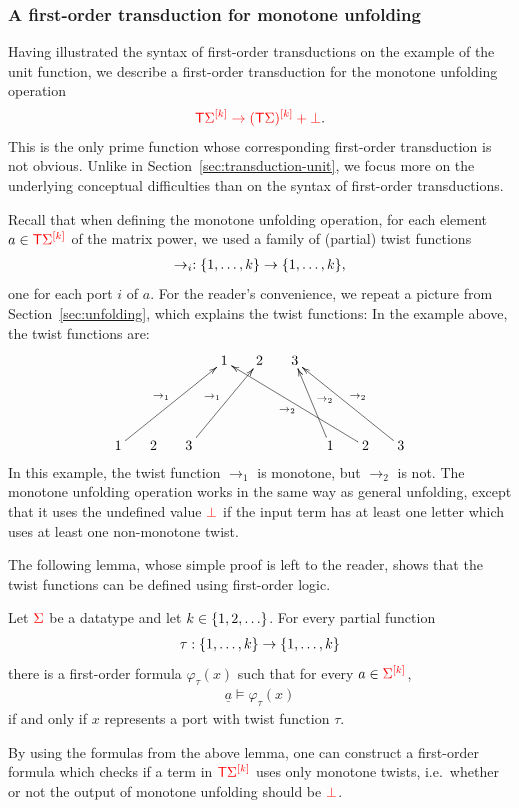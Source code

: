\subsubsection{A first-order transduction for monotone unfolding}
\label{sec:fo-transduction-for-unfolding}
Having illustrated the syntax of first-order transductions on the example of the unit function, we describe a first-order transduction for the monotone unfolding operation 
\begin{align*}
    \ranked{\tmonad \mati k{\Sigma} \to \mati k{( \tmonad \Sigma)} + \termset}.
\end{align*}
This is the only prime function whose corresponding first-order transduction is not obvious.
Unlike in Section~\ref{sec:transduction-unit},  we focus more  on the underlying conceptual difficulties than on the syntax of first-order transductions. 

Recall  that when  defining the  monotone  unfolding operation,  for each element $a \in \ranked{\tmonad \mati k{\Sigma}}$ of the matrix power, we used a family of (partial) twist functions
\begin{align*}
\to_i : \set{1,\ldots,k} \to \set{1,\ldots,k},
\end{align*}
one for each port $i$ of $a$. For the reader's convenience, we repeat a picture from Section~\ref{sec:unfolding}, which explains the twist functions:
In the example  above, the twist functions are:
\begin{align*}
\xymatrix@C=0.5cm@R=1.7cm{
     & && 1 & 2 & 3 \\
    1\ar[urrr]^-{\to_1} & 2 & 3 \ar[urr]^-{\to_1} &&&&
    1\ar[ul]_-{\to_2} & 2\ar[ullll]^-{\to_2} & 3\ar[ulll]_-{\to_2}
}
\end{align*}
In this example, the twist function $\to_1$ is monotone, but  $\to_2$ is not. The monotone unfolding operation works in the same way as general  unfolding, except that it uses the undefined value $\termset$ if the input term has at least one letter which uses at least one non-monotone twist. 

The following lemma, whose simple proof is left to the reader, shows that the twist functions can be defined using first-order logic.
\begin{lemma}
    Let $\rSigma$ be a datatype and let $k \in \set{1,2,\ldots}$. For every partial function
    \begin{align*}
    \tau : \set{1,\ldots,k} \to \set{1,\ldots,k}
    \end{align*}
    there is a first-order formula $\varphi_\tau(x)$ such that for every $a \in \mati k \rSigma$, 
    \begin{align*}
    \underline a \models \varphi_\tau(x)
    \end{align*}
     if and only if $x$ represents a port  with twist function $\tau$.  
\end{lemma}
By using the formulas from the above lemma, one can construct  a first-order formula which checks if a term in $\tmonad \mati k \rSigma$ uses only monotone twists, i.e.~whether or not the output of monotone unfolding should be $\termset$. 


